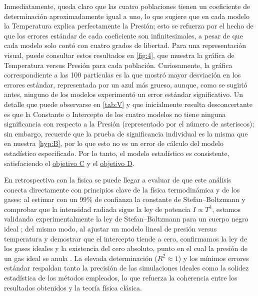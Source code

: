 \documentclass[12pt,a4paper]{config/myConfig}
\begin{document}
Inmediatamente, queda claro que las cuatro poblaciones tienen un coeficiente de determinación aproximadamente igual a uno, lo que sugiere que en cada modelo la Temperatura explica perfectamente la Presión; esto se refuerza por el hecho de que los errores estándar de cada coeficiente son infinitesimales, a pesar de que cada modelo solo contó con cuatro grados de libertad. Para una representación visual, puede consultar estos resultados en \cref{fig:4}, que muestra la gráfica de Temperatura versus Presión para cada población. Curiosamente, la gráfica correspondiente a las 100 partículas es la que mostró mayor desviación en los errores estándar, representada por un azul más grueso, aunque, como se sugirió antes, ninguno de los modelos experimentó un error estándar significativo. Un detalle que puede observarse en \cref{tab:V} y que inicialmente resulta desconcertante es que la Constante o Intercepto de los cuatro modelos no tiene ninguna significancia con respecto a la Presión (representado por el número de asteriscos); sin embargo, recuerde que la prueba de significancia individual es la misma que en nuestra \cref{hyp:B}, por lo que esto no es un error de cálculo del modelo estadístico especificado. Por lo tanto, el modelo estadístico es consistente, satisfaciendo el \hyperref[obj:C]{objetivo C} y el \hyperref[obj:D]{objetivo D}.\newline

En retrospectiva con la fisica se puede llegar a evaluar de que este análisis conecta directamente con principios clave de la física termodinámica y de los gases: al estimar con un 99\% de confianza la constante de Stefan–Boltzmann y comprobar que la intensidad radiada sigue la ley de potencia \(I \propto T^4\), estamos validando experimentalmente la ley de Stefan–Boltzmann para un cuerpo negro ideal \cite{physicsTextbook}; del mismo modo, al ajustar un modelo lineal de presión versus temperatura y demostrar que el intercepto tiende a cero, confirmamos la ley de los gases ideales y la existencia del cero absoluto, punto en el cual la presión de un gas ideal se anula \cite{physicsTextbook}. La elevada determinación (\(R^2 \approx 1\)) y los mínimos errores estándar respaldan tanto la precisión de las simulaciones ideales como la solidez estadística de los métodos empleados, lo que refuerza la coherencia entre los resultados obtenidos y la teoría física clásica.  




\end{document}
